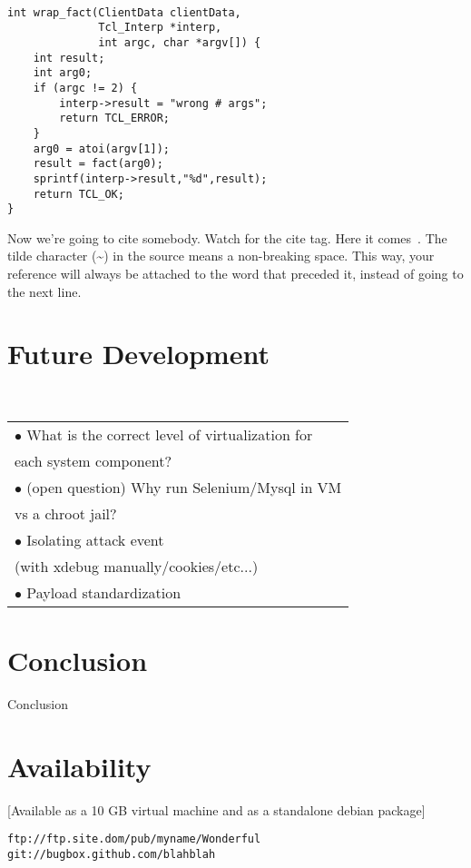 \documentclass[letterpaper,twocolumn,10pt]{article}
\begin{document}
{\tt \small
\begin{verbatim}
int wrap_fact(ClientData clientData,
              Tcl_Interp *interp,
              int argc, char *argv[]) {
    int result;
    int arg0;
    if (argc != 2) {
        interp->result = "wrong # args";
        return TCL_ERROR;
    }
    arg0 = atoi(argv[1]);
    result = fact(arg0);
    sprintf(interp->result,"%d",result);
    return TCL_OK;
}
\end{verbatim}
}

Now we're going to cite somebody.  Watch for the cite tag.
Here it comes~\cite{Chaum1981,Diffie1976}.  The tilde character (\~{})
in the source means a non-breaking space.  This way, your reference will
always be attached to the word that preceded it, instead of going to the
next line.

\section{Future Development}\\
 \begin{tabular} { l }
   $\bullet$ What is the correct level of virtualization for\\ each system component?\\
   $\bullet$ (open question) Why run Selenium/Mysql in VM\\ vs a chroot jail?\\
   $\bullet$ Isolating attack event \\(with xdebug manually/cookies/etc...)\\
   $\bullet$ Payload standardization
 \end{tabular}


\section{Conclusion}

Conclusion

\section{Availability}

[Available as a 10 GB virtual machine and as a standalone debian package]

\begin{center}
{\tt ftp://ftp.site.dom/pub/myname/Wonderful}\\
{\tt git://bugbox.github.com/blahblah}\\
\end{center}
\end{document}
